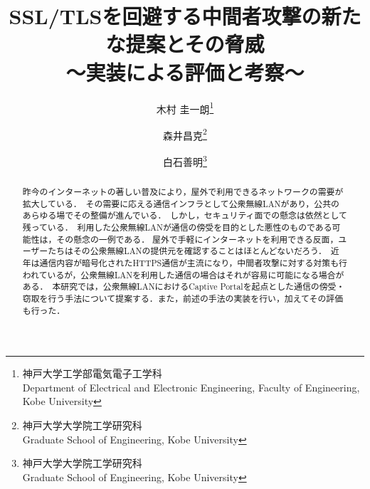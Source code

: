 \documentclass[dvipdfmx,twocolumn,9pt]{jsarticle}
\begin{document}
    \title{SSL/TLSを回避する中間者攻撃の新たな提案とその脅威\\～実装による評価と考察～}
    \author{木村 圭一朗\thanks{神戸大学工学部電気電子工学科\\Department of Electrical and Electronic Engineering, Faculty of Engineering, Kobe University} \and 森井昌克\thanks{神戸大学大学院工学研究科\\Graduate School of Engineering, Kobe University} \and 白石善明\thanks{神戸大学大学院工学研究科\\Graduate School of Engineering, Kobe University}}
    \date{}
    \begin{abstract}
        昨今のインターネットの著しい普及により，屋外で利用できるネットワークの需要が拡大している．\
        その需要に応える通信インフラとして公衆無線LANがあり，公共のあらゆる場でその整備が進んでいる．\
        しかし，セキュリティ面での懸念は依然として残っている．\
        利用した公衆無線LANが通信の傍受を目的とした悪性のものである可能性は，その懸念の一例である．
        屋外で手軽にインターネットを利用できる反面，ユーザーたちはその公衆無線LANの提供元を確認することはほとんどないだろう．\
        近年は通信内容が暗号化されたHTTPS通信が主流になり，中間者攻撃に対する対策も行われているが，公衆無線LANを利用した通信の場合はそれが容易に可能になる場合がある．\
        本研究では，公衆無線LANにおけるCaptive Portalを起点とした通信の傍受・窃取を行う手法について提案する．また，前述の手法の実装を行い，加えてその評価も行った．\\
    \end{abstract}
    \maketitle
\end{document}

